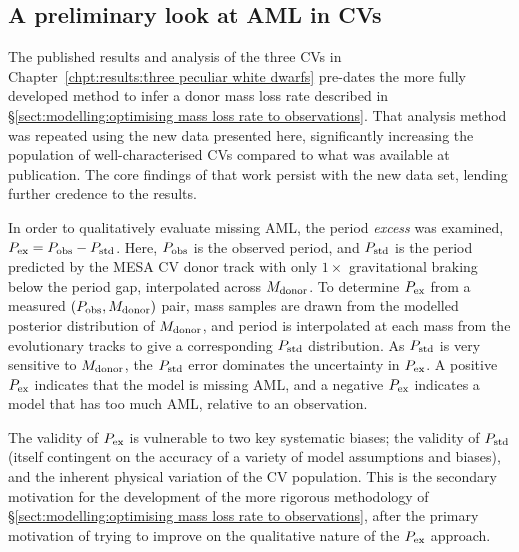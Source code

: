 \subsection{A preliminary look at AML in CVs}
\label{sect:12 new cvs:period excess}

The published results and analysis of the three CVs in Chapter~\ref{chpt:results:three peculiar white dwarfs} \citep{wild2021} pre-dates the more fully developed method to infer a donor mass loss rate described in \S\ref{sect:modelling:optimising mass loss rate to observations}.
That analysis method was repeated using the new data presented here, significantly increasing the population of well-characterised CVs compared to what was available at publication. The core findings of that work persist with the new data set, lending further credence to the results.

In order to qualitatively evaluate missing AML, the period \textit{excess} was examined, $P_{\rm ex} = P_{\rm obs} - P_{\rm std}$. Here, $P_{\rm obs}$ is the observed period, and $P_{\rm std}$ is the period predicted by the MESA CV donor track with only $1\times$ gravitational braking below the period gap, interpolated across $M_{\rm donor}$.
To determine $P_{\rm ex}$ from a measured $(P_{\rm obs}, M_{\rm donor})$ pair, mass samples are drawn from the modelled posterior distribution of $M_{\rm donor}$, and period is interpolated at each mass from the evolutionary tracks to give a corresponding $P_{\rm std}$ distribution. As $P_{\rm std}$ is very sensitive to $M_{\rm donor}$, the $P_{\rm std}$ error dominates the uncertainty in $P_{\rm ex}$.
A positive $P_{\rm ex}$ indicates that the model is missing AML, and a negative $P_{\rm ex}$ indicates a model that has too much AML, relative to an observation.

The validity of $P_{\rm ex}$ is vulnerable to two key systematic biases; the validity of $P_{\rm std}$ (itself contingent on the accuracy of a variety of model assumptions and biases), and the inherent physical variation of the CV population. This is the secondary motivation for the development of the more rigorous methodology of \S\ref{sect:modelling:optimising mass loss rate to observations}, after the primary motivation of trying to improve on the qualitative nature of the $P_{\rm ex}$ approach.

